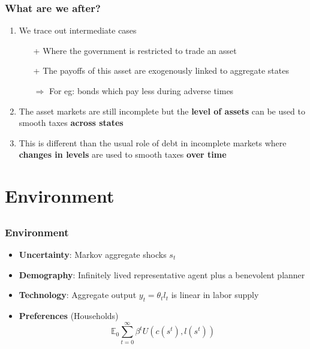 \documentclass{beamer}
\begin{document}
\begin{frame}
\frametitle{What are we after?}

\begin{enumerate}
\item We trace out intermediate cases 
\begin{itemize}
\item [+] Where the government is restricted to trade an asset
\item [+] The payoffs of this asset are exogenously linked to aggregate states
 
 $\Longrightarrow$ For eg: bonds which pay less during adverse times

 \end{itemize}
\item The asset markets are still incomplete but the {\color{black} \textbf{level of assets} }can be used to smooth taxes {\color{black} \textbf{ across  states}}
\item This is different than the usual role of debt in incomplete markets where{ \color{black} \textbf{changes in levels}} are used to smooth taxes {\color{black}  \textbf{ over  time}}
\end{enumerate}

\end{frame}


\section{Environment}
\subsection{}

\begin{frame}
 \frametitle{Environment}
 \begin{itemize}
 \item \textbf{Uncertainty}: Markov aggregate shocks $s_t$
  \item \textbf{Demography}: Infinitely lived representative agent plus a benevolent planner
  \item \textbf{Technology}: Aggregate output  $y_t=\theta_{t} l_{t}$ is linear in labor supply
  \item \textbf{Preferences }(Households)
  \begin{equation*}
\mathbb{E}_{0}\sum_{t=0}^{\infty } \beta^t  U\left(
c(s^t),l(s^t)\right)  \label{utility lifetime}
\end{equation*}%
 \end{itemize}

\end{frame}
\end{document}
